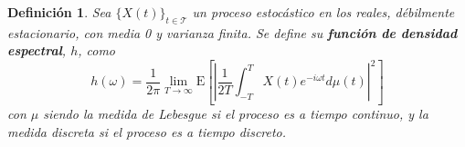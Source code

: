 \documentclass[12pt,letterpaper]{book}
\newtheorem{definicion}{Definición}[chapter]
\newcommand{\Z}{\mathbb{Z}}
\newcommand{\E}[1]{\mathrm{E}\left[ #1 \right]}
\newcommand{\abso}[1]{\left| #1 \right|}
\newcommand{\xt}{$\{X(t)\}_{t\in \mathcal{T}}$ }
\begin{document}

\begin{definicion}%
Sea \xt un proceso estocástico en los reales, débilmente estacionario, con media 0 y varianza finita. Se define su \textbf{función de densidad espectral}, $h$, como
\begin{equation}
h(\omega) = \frac{1}{2 \pi} \lim_{T\rightarrow \infty} \E{ \abso{ \frac{1}{2T} \int_{-T}^{T} X(t) e^{-i \omega t} d\mu(t)}^{2} }
\end{equation}
con $\mu$ siendo la medida de Lebesgue si el proceso es a tiempo continuo, y la medida discreta si el proceso es a tiempo discreto.
\label{txt_FDE_cont}
\end{definicion}


\end{document}
